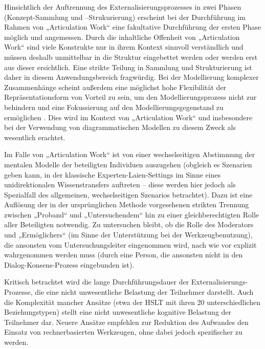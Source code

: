 Hinsichtlich der Auftrennung des Externalisierungsprozesses in zwei Phasen (Konzept-Sammlung und –Strukurierung) erscheint bei der Durchführung im Rahmen von „Articulation Work“ eine fakultative Durchführung der ersten Phase möglich und angemessen. Durch die inhaltliche Offenheit von „Articulation Work“ sind viele Konstrukte nur in ihrem Kontext sinnvoll verständlich und müssen deshalb unmittelbar in die Struktur eingebettet werden oder werden erst aus dieser ersichtlich. Eine strikte Teilung in Sammlung und Strukturierung ist daher in diesem Anwendungsbereich fragwürdig. Bei der Modellierung komplexer Zusammenhänge scheint außerdem eine möglichst hohe Flexibilität der Repräsentationsform von Vorteil zu sein, um den Modellierungsprozess nicht zur behindern und eine Fokussierung auf den Modellierungsgegenstand zu ermöglichen \citep[][S. 6]{Goguen93}. Dies wird im Kontext von „Articulation Work“ \citep[][S. 10]{Schmidt00} und insbesondere bei der Verwendung von diagrammatischen Modellen zu diesem Zweck \citep[][S. 23]{Jorgensen04} als wesentlich erachtet. 

Im Falle von „Articulation Work“ ist von einer wechselseitigen Abstimmung der mentalen Modelle der beteiligten Individuen auszugehen (obgleich es Szenarien geben kann, in der klassische Experten-Laien-Settings im Sinne eines unidirektionalen Wissenstransfers auftreten – diese werden hier jedoch als Spezialfall des allgemeinen, wechselseitigen Szenarios betrachtet). Dazu ist eine Auflösung der in der ursprünglichen Methode vorgesehenen strikten Trennung zwischen „Proband“ und „Untersuchendem“ hin zu einer gleichberechtigten Rolle aller Beteiligten notwendig. Zu untersuchen bleibt, ob die Rolle des Moderators und „Ermöglichers“ (im Sinne der Unterstützung bei der Werkzeugbenutzung), die ansonsten vom Untersuchungsleiter eingenommen wird, nach wie vor explizit wahrgenommen werden muss (durch eine Person, die ansonsten nicht in den Dialog-Konsens-Prozess eingebunden ist).

Kritisch betrachtet wird die lange Durchführungsdauer der Externalisierungs-Prozesse, die eine nicht unwesentliche Belastung der Teilnehmer darstellt. Auch die Komplexität mancher Ansätze (etwa der \gls{HSLT} mit ihren 20 unterschiedlichen Beziehungstypen) stellt eine nicht unwesentliche kognitive Belastung der Teilnehmer dar.  Neuere Ansätze empfehlen zur Reduktion des Aufwandes den Einsatz von rechnerbasierten Werkzeugen, ohne dabei jedoch spezifischer zu werden. \citep[][S. 29f]{Ifenthaler06}

